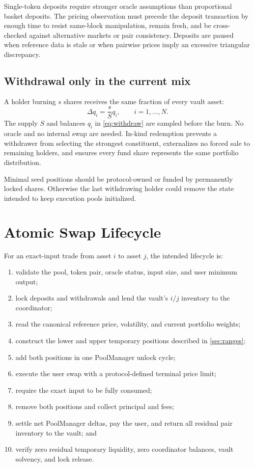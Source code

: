 \documentclass[11pt]{article}
\begin{document}
Single-token deposits require stronger oracle assumptions than proportional
basket deposits. The pricing observation must precede the deposit transaction
by enough time to resist same-block manipulation, remain fresh, and be
cross-checked against alternative markets or pair consistency. Deposits are
paused when reference data is stale or when pairwise prices imply an excessive
triangular discrepancy.

\subsection{Withdrawal only in the current mix}

A holder burning $s$ shares receives the same fraction of every vault asset:
\begin{equation}
  \Delta q_i=\frac{s}{S}q_i,\qquad i=1,\ldots,N.
  \label{eq:withdraw}
\end{equation}
The supply $S$ and balances $q_i$ in \cref{eq:withdraw} are sampled before the
burn. No oracle and no internal swap are needed. In-kind redemption prevents a
withdrawer from selecting the strongest constituent, externalizes no forced
sale to remaining holders, and ensures every fund share represents the same
portfolio distribution.

Minimal seed positions should be protocol-owned or funded by permanently
locked shares. Otherwise the last withdrawing holder could remove the state
intended to keep execution pools initialized.

\section{Atomic Swap Lifecycle}

For an exact-input trade from asset $i$ to asset $j$, the intended lifecycle is:

\begin{enumerate}
  \item validate the pool, token pair, oracle status, input size, and user
        minimum output;
  \item lock deposits and withdrawals and lend the vault's $i/j$ inventory to
        the coordinator;
  \item read the canonical reference price, volatility, and current portfolio
        weights;
  \item construct the lower and upper temporary positions described in
        \cref{sec:ranges};
  \item add both positions in one PoolManager unlock cycle;
  \item execute the user swap with a protocol-defined terminal price limit;
  \item require the exact input to be fully consumed;
  \item remove both positions and collect principal and fees;
  \item settle net PoolManager deltas, pay the user, and return all residual
        pair inventory to the vault; and
  \item verify zero residual temporary liquidity, zero coordinator balances,
        vault solvency, and lock release.
\end{enumerate}
\end{document}
